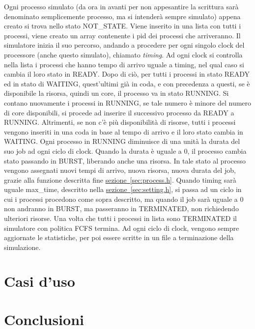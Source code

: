 \documentclass[Lau, oneside]{sapthesis}%
\begin{document}
Ogni processo simulato (da ora in avanti per non appesantire la scrittura sarà denominato semplicemente processo, ma si intenderà sempre simulato) appena creato si trova nello stato NOT\_STATE.
Viene inserito in una lista con tutti i processi, viene creato un array contenente i pid dei processi che arriveranno.
Il simulatore inizia il suo percorso, andando a procedere per ogni singolo clock del processore (anche questo simulato), chiamato \textit{timing}.
Ad ogni clock si controlla nella lista i processi che hanno tempo di arrivo uguale a timing, nel qual caso si cambia il loro stato in READY.
Dopo di ciò, per tutti i processi in stato READY ed in stato di WAITING, quest'ultimi già in coda, e con precedenza a questi, se è disponibile la risorsa, quindi un core, il processo va in stato RUNNING.
Si contano nuovamente i processi in RUNNING, se tale numero è minore del numero di core disponibili, si procede ad inserire il successivo processo da READY a RUNNING.
Altrimenti, se non c'è più disponibilità di risorse, tutti i processi vengono inseriti in una coda in base al tempo di arrivo e il loro stato cambia in WAITING.
Ogni processo in RUNNING diminuisce di una unità la durata del suo job ad ogni ciclo di clock.
Quando la durata è uguale a 0, il processo cambia stato passando in BURST, liberando anche una risorsa.
In tale stato al processo vengono assegnati nuovi tempi di arrivo, nuova risorsa, nuova durata del job, grazie alla funzione descritta fine \hyperref[sec:process.h]{sezione~\ref*{sec:process.h}}.
Quando timing sarà uguale max\_time, descritto nella \hyperref[sec:setting.h]{sezione~\ref*{sec:setting.h}}, si passa ad un ciclo in cui i processi procedono come sopra descritto, ma quando il job sarà uguale a 0 non andranno in BURST, ma passeranno in TERMINATED, non richiedendo ulteriori risorse.
Una volta che tutti i processi in lista sono TERMINATED il simulatore con politica FCFS termina.
Ad ogni ciclo di clock, vengono sempre aggiornate le statistiche, per poi essere scritte in un file a terminazione della simulazione.

\chapter{Casi d'uso}
\label{chap:3}

\chapter{Conclusioni}
\label{chap:4}
\end{document}
